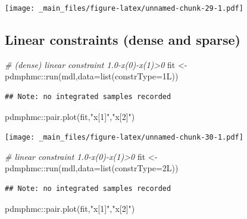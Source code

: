 \documentclass[
]{book}
\newenvironment{Shaded}{\begin{snugshade}}{\end{snugshade}}
\newcommand{\AttributeTok}[1]{\textcolor[rgb]{0.77,0.63,0.00}{#1}}
\newcommand{\CommentTok}[1]{\textcolor[rgb]{0.56,0.35,0.01}{\textit{#1}}}
\newcommand{\FunctionTok}[1]{\textcolor[rgb]{0.00,0.00,0.00}{#1}}
\newcommand{\NormalTok}[1]{#1}
\newcommand{\OtherTok}[1]{\textcolor[rgb]{0.56,0.35,0.01}{#1}}
\newcommand{\SpecialCharTok}[1]{\textcolor[rgb]{0.00,0.00,0.00}{#1}}
\newcommand{\StringTok}[1]{\textcolor[rgb]{0.31,0.60,0.02}{#1}}
\begin{document}
\texttt{[image: \_main\_files/figure-latex/unnamed-chunk-29-1.pdf]}

\hypertarget{linear-constraints-dense-and-sparse}{%
\subsection{Linear constraints (dense and sparse)}\label{linear-constraints-dense-and-sparse}}

\begin{Shaded}
\begin{Highlighting}[]
\CommentTok{\# (dense) linear constraint 1.0{-}x(0){-}x(1)\textgreater{}0}
\NormalTok{fit }\OtherTok{\textless{}{-}}\NormalTok{ pdmphmc}\SpecialCharTok{::}\FunctionTok{run}\NormalTok{(mdl,}\AttributeTok{data=}\FunctionTok{list}\NormalTok{(}\AttributeTok{constrType=}\NormalTok{1L))}
\end{Highlighting}
\end{Shaded}

\begin{verbatim}
## Note: no integrated samples recorded
\end{verbatim}

\begin{Shaded}
\begin{Highlighting}[]
\NormalTok{pdmphmc}\SpecialCharTok{::}\FunctionTok{pair.plot}\NormalTok{(fit,}\StringTok{"x[1]"}\NormalTok{,}\StringTok{"x[2]"}\NormalTok{)}
\end{Highlighting}
\end{Shaded}

\texttt{[image: \_main\_files/figure-latex/unnamed-chunk-30-1.pdf]}

\begin{Shaded}
\begin{Highlighting}[]
\CommentTok{\# linear constraint 1.0{-}x(0){-}x(1)\textgreater{}0}
\NormalTok{fit }\OtherTok{\textless{}{-}}\NormalTok{ pdmphmc}\SpecialCharTok{::}\FunctionTok{run}\NormalTok{(mdl,}\AttributeTok{data=}\FunctionTok{list}\NormalTok{(}\AttributeTok{constrType=}\NormalTok{2L))}
\end{Highlighting}
\end{Shaded}

\begin{verbatim}
## Note: no integrated samples recorded
\end{verbatim}

\begin{Shaded}
\begin{Highlighting}[]
\NormalTok{pdmphmc}\SpecialCharTok{::}\FunctionTok{pair.plot}\NormalTok{(fit,}\StringTok{"x[1]"}\NormalTok{,}\StringTok{"x[2]"}\NormalTok{)}
\end{Highlighting}
\end{Shaded}
\end{document}

